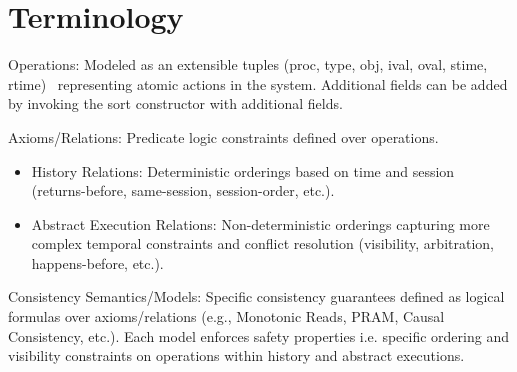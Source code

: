 \section{Terminology}


Operations: Modeled as an extensible tuples (proc, type, obj,
  ival, oval, stime,
rtime)~\cite{viotti2016consistency} representing atomic actions
in the system.
Additional fields can be added by invoking the sort constructor
with additional
fields.

Axioms/Relations: Predicate logic constraints defined over operations.
\begin{itemize}
  \item History Relations: Deterministic orderings based on time and session
    (returns-before, same-session, session-order, etc.).
  \item Abstract Execution Relations: Non-deterministic orderings
    capturing more complex
    temporal constraints and conflict resolution (visibility, arbitration,
    happens-before, etc.).
\end{itemize}

Consistency Semantics/Models: Specific consistency guarantees
defined as logical
formulas over axioms/relations (e.g., Monotonic Reads, PRAM,
  Causal Consistency,
etc.). Each model enforces safety properties i.e. specific ordering and
visibility constraints on operations within history and abstract executions.

